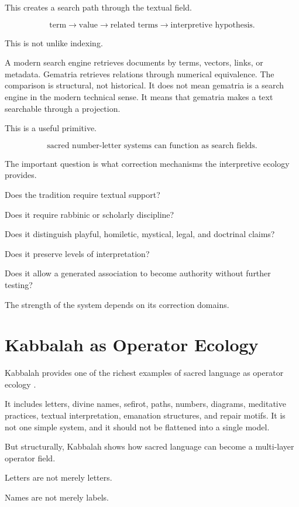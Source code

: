 \documentclass[11pt]{book}
\begin{document}
This creates a search path through the textual field.

\[
\text{term}
\rightarrow
\text{value}
\rightarrow
\text{related terms}
\rightarrow
\text{interpretive hypothesis}.
\]

This is not unlike indexing.

A modern search engine retrieves documents by terms, vectors, links, or metadata. Gematria retrieves relations through numerical equivalence. The comparison is structural, not historical. It does not mean gematria is a search engine in the modern technical sense. It means that gematria makes a text searchable through a projection.

This is a useful primitive.

\[
\text{sacred number-letter systems can function as search fields}.
\]

The important question is what correction mechanisms the interpretive ecology provides.

Does the tradition require textual support?

Does it require rabbinic or scholarly discipline?

Does it distinguish playful, homiletic, mystical, legal, and doctrinal claims?

Does it preserve levels of interpretation?

Does it allow a generated association to become authority without further testing?

The strength of the system depends on its correction domains.

\section{Kabbalah as Operator Ecology}

Kabbalah provides one of the richest examples of sacred language as operator ecology \cite{Scholem1974Kabbalah,Idel1988KabbalahNewPerspectives}.

It includes letters, divine names, sefirot, paths, numbers, diagrams, meditative practices, textual interpretation, emanation structures, and repair motifs. It is not one simple system, and it should not be flattened into a single model.

But structurally, Kabbalah shows how sacred language can become a multi-layer operator field.

Letters are not merely letters.

Names are not merely labels.
\end{document}
